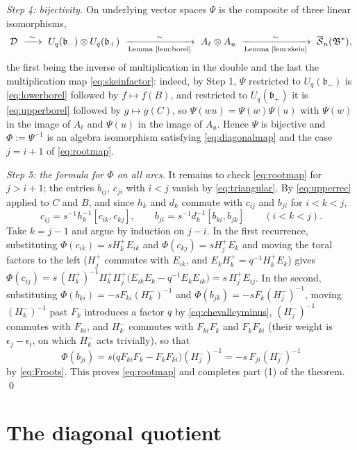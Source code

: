 \documentclass[12pt]{article}
\theoremstyle{remark}
\newcommand{\U}{U_q}
\newcommand{\bp}{\mathfrak b_+}
\newcommand{\bm}{\mathfrak b_-}
\newcommand{\redS}{\overline{\mathcal S}_n}
\newcommand{\Bstar}{\mathfrak B^*}
\newcommand{\ot}{\otimes}
\newcommand{\cD}{\mathcal D}
\begin{document}
\emph{Step 4: bijectivity.} On underlying vector spaces $\Psi$ is the
composite of three linear isomorphisms,
\begin{equation}\label{eq:bijective}
 \cD\ \xrightarrow{\ \sim\ }\ \U(\bm)\ot\U(\bp)
 \ \xrightarrow[\text{Lemma \ref{lem:borel}}]{\ \sim\ }\
 A_\ell\ot A_u
 \ \xrightarrow[\text{Lemma \ref{lem:skein}}]{\ \sim\ }\
 \redS(\Bstar),
\end{equation}
the first being the inverse of multiplication in the double and the
last the multiplication map \eqref{eq:skeinfactor}: indeed, by Step 1,
$\Psi$ restricted to $\U(\bm)$ is \eqref{eq:lowerborel} followed by
$f\mapsto f(B)$, and restricted to $\U(\bp)$ it is \eqref{eq:upperborel}
followed by $g\mapsto g(C)$, so
$\Psi(wu)=\Psi(w)\Psi(u)$ with $\Psi(w)$ in the image of $A_\ell$ and
$\Psi(u)$ in the image of $A_u$. Hence $\Psi$ is bijective and
$\Phi:=\Psi^{-1}$ is an algebra isomorphism satisfying
\eqref{eq:diagonalmap} and the case $j=i+1$ of \eqref{eq:rootmap}.

\emph{Step 5: the formula for $\Phi$ on all arcs.} It remains to check
\eqref{eq:rootmap} for $j>i+1$; the entries $b_{ij}$, $c_{ji}$ with
$i<j$ vanish by \eqref{eq:triangular}. By \eqref{eq:upperrec} applied to
$C$ and $B$, and since $h_k$ and $d_k$ commute with $c_{ij}$ and $b_{ji}$
for $i<k<j$,
\begin{equation}\label{eq:arcrec}
 c_{ij}=s^{-1}h_k^{-1}[c_{ik},c_{kj}],\qquad
 b_{ji}=s^{-1}d_k^{-1}[b_{ki},b_{jk}]\qquad(i<k<j).
\end{equation}
Take $k=j-1$ and argue by induction on $j-i$. In the first recurrence,
substituting $\Phi(c_{ik})=sH^+_kE_{ik}$ and
$\Phi(c_{kj})=sH^+_jE_{k}$ and moving the toral factors to the left
($H^+_j$ commutes with $E_{ik}$, and $E_kH^+_k=q^{-1}H^+_kE_k$) gives
$\Phi(c_{ij})=s\,(H^+_k)^{-1}H^+_kH^+_j
 \bigl(E_{ik}E_k-q^{-1}E_kE_{ik}\bigr)=s\,H^+_jE_{ij}$.
In the second, substituting $\Phi(b_{ki})=-sF_{ki}(H^-_k)^{-1}$ and
$\Phi(b_{jk})=-sF_k(H^-_j)^{-1}$, moving $(H^-_k)^{-1}$ past $F_k$
introduces a factor $q$ by \eqref{eq:chevalleyminus}, $(H^-_j)^{-1}$
commutes with $F_{ki}$, and $H^-_k$ commutes with $F_{ki}F_k$ and
$F_kF_{ki}$ (their weight is $\epsilon_j-\epsilon_i$, on which $H^-_k$
acts trivially), so that
\[
 \Phi(b_{ji})=s\bigl(qF_{ki}F_k-F_kF_{ki}\bigr)(H^-_j)^{-1}
 =-s\,F_{ji}(H^-_j)^{-1}
\]
by \eqref{eq:Froots}. This proves \eqref{eq:rootmap} and completes
part (1) of the theorem. \qed

\section{The diagonal quotient}\label{sec:quotient}
\end{document}
